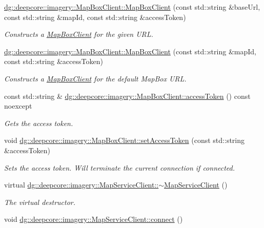 \begin{DoxyCompactItemize}
\hyperlink{group___imagery_module_ga1377794e139dc1d5042a91da0f31a382}{dg\+::deepcore\+::imagery\+::\+Map\+Box\+Client\+::\+Map\+Box\+Client} (const std\+::string \&base\+Url, const std\+::string \&map\+Id, const std\+::string \&access\+Token)
\begin{DoxyCompactList}\small\item\em Constructs a \hyperlink{classdg_1_1deepcore_1_1imagery_1_1_map_box_client}{Map\+Box\+Client} for the given U\+RL. \end{DoxyCompactList}\item 
\hyperlink{group___imagery_module_ga9258467b609a2dad474905cd984f4451}{dg\+::deepcore\+::imagery\+::\+Map\+Box\+Client\+::\+Map\+Box\+Client} (const std\+::string \&map\+Id, const std\+::string \&access\+Token)
\begin{DoxyCompactList}\small\item\em Constructs a \hyperlink{classdg_1_1deepcore_1_1imagery_1_1_map_box_client}{Map\+Box\+Client} for the default Map\+Box U\+RL. \end{DoxyCompactList}\item 
const std\+::string \& \hyperlink{group___imagery_module_ga09b8428dd2d706d2816a06509cdefdf3}{dg\+::deepcore\+::imagery\+::\+Map\+Box\+Client\+::access\+Token} () const noexcept
\begin{DoxyCompactList}\small\item\em Gets the access token. \end{DoxyCompactList}\item 
void \hyperlink{group___imagery_module_ga24970dc0f6164b6592cb6a97bab71e15}{dg\+::deepcore\+::imagery\+::\+Map\+Box\+Client\+::set\+Access\+Token} (const std\+::string \&access\+Token)
\begin{DoxyCompactList}\small\item\em Sets the access token. Will terminate the current connection if connected. \end{DoxyCompactList}\item 
virtual \hyperlink{group___imagery_module_ga93933812a2678d47a119231a41b52e2d}{dg\+::deepcore\+::imagery\+::\+Map\+Service\+Client\+::$\sim$\+Map\+Service\+Client} ()
\begin{DoxyCompactList}\small\item\em The virtual destructor. \end{DoxyCompactList}\item 
void \hyperlink{group___imagery_module_ga5e5f58c725cafba7966936f688a6ade0}{dg\+::deepcore\+::imagery\+::\+Map\+Service\+Client\+::connect} ()

\end{DoxyCompactItemize}
